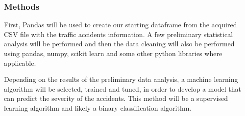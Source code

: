 \documentclass{article}
\begin{document}
		\subsubsection{Methods}
			First, Pandas will be used to create our starting dataframe from the acquired CSV file with the traffic accidents information. A few preliminary statistical analysis will be performed and then the data cleaning will also be performed using pandas, numpy, scikit learn and some other python libraries where applicable. 
			
			Depending on the results of the preliminary data analysis, a machine learning algorithm will be selected, trained and tuned, in order to develop a model that can predict the severity of the accidents. This method will be a supervised learning algorithm and likely a binary classification algorithm.
		
		
		
	
	
	
	
	
	
	
	
\end{document}
